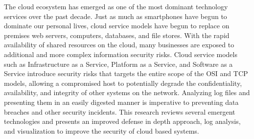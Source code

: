 \documentclass[./main.tex]{subfiles}
\begin{document}
The cloud ecosystem has emerged as one of the most dominant technology services over the past decade. Just as much as smartphones have begun to dominate our personal lives, cloud service models have begun to replace on premises web servers, computers, databases, and file stores. With the rapid availability of shared resources on the cloud, many businesses are exposed to additional and more complex information security risks. Cloud service models such as Infrastructure as a Service, Platform as a Service, and Software as a Service introduce security risks that targets the entire scope of the OSI and TCP models, allowing a compromised host to potentially degrade the confidentiality, availability, and integrity of other systems on the network. Analyzing log files and presenting them in an easily digested manner is imperative to preventing data breaches and other security incidents. This research reviews several emergent technologies and presents an improved defense in depth approach, log analysis, and visualization to improve the security of cloud based systems.
\end{document}
